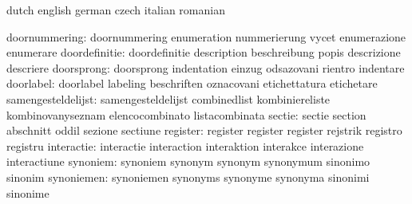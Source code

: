 \stopvariables




\startsetupvariables       dutch                     english
                           german                    czech
                           italian                   romanian

            doornummering: doornummering             enumeration
                           nummerierung              vycet
                           enumerazione              enumerare
            doordefinitie: doordefinitie             description
                           beschreibung              popis
                           descrizione               descriere
               doorsprong: doorsprong                indentation
                           einzug                    odsazovani
                           rientro                   indentare
                doorlabel: doorlabel                 labeling
                           beschriften               oznacovani
                           etichettatura             etichetare
       samengesteldelijst: samengesteldelijst        combinedlist
                           kombiniereliste           kombinovanyseznam
                           elencocombinato           listacombinata
                   sectie: sectie                    section
                           abschnitt                 oddil
                           sezione                   sectiune
                 register: register                  register
                           register                  rejstrik
                           registro                  registru
               interactie: interactie                interaction
                           interaktion               interakce
                           interazione               interactiune
                 synoniem: synoniem                  synonym
                           synonym                   synonymum
                           sinonimo                  sinonim
               synoniemen: synoniemen                synonyms
                           synonyme                  synonyma
                           sinonimi                  sinonime
